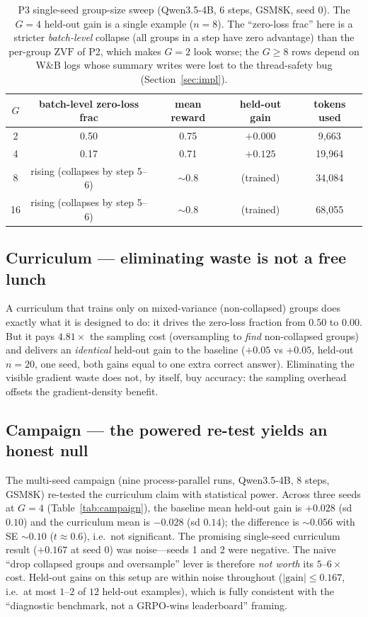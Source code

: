\documentclass[12pt,a4paper]{report}
\newcommand{\zvf}{\mathrm{ZVF}}
\begin{document}
\begin{table}[t]
\centering
\small
\begin{tabular}{@{}ccccc@{}}
\toprule
$G$ & batch-level zero-loss frac & mean reward & held-out gain & tokens used \\
\midrule
2  & 0.50 & 0.75 & $+0.000$ & 9{,}663 \\
4  & 0.17 & 0.71 & $+0.125$ & 19{,}964 \\
8  & rising (collapses by step 5--6) & ${\sim}0.8$ & (trained) & 34{,}084 \\
16 & rising (collapses by step 5--6) & ${\sim}0.8$ & (trained) & 68{,}055 \\
\bottomrule
\end{tabular}
\caption{P3 single-seed group-size sweep (Qwen3.5-4B, 6 steps, GSM8K, seed 0).
The $G{=}4$ held-out gain is a single example ($n=8$). The ``zero-loss frac''
here is a stricter \emph{batch-level} collapse (all groups in a step have zero
advantage) than the per-group $\zvf$ of P2, which makes $G{=}2$ look worse; the
$G\ge8$ rows depend on W\&B logs whose summary writes were lost to the
thread-safety bug (Section~\ref{sec:impl}).}
\label{tab:p3}
\end{table}

\subsection{Curriculum --- eliminating waste is not a free lunch}
A curriculum that trains only on mixed-variance (non-collapsed) groups does
exactly what it is designed to do: it drives the zero-loss fraction from $0.50$
to $0.00$. But it pays $4.81\times$ the sampling cost (oversampling to \emph{find}
non-collapsed groups) and delivers an \emph{identical} held-out gain to the
baseline ($+0.05$ vs $+0.05$, held-out $n=20$, one seed, both gains equal to one
extra correct answer). Eliminating the visible gradient waste does not, by
itself, buy accuracy: the sampling overhead offsets the gradient-density benefit.

\subsection{Campaign --- the powered re-test yields an honest null}

The multi-seed campaign (nine process-parallel runs, Qwen3.5-4B, 8 steps, GSM8K)
re-tested the curriculum claim with statistical power. Across three seeds at
$G{=}4$ (Table~\ref{tab:campaign}), the baseline mean held-out gain is
$+0.028$ (sd $0.10$) and the curriculum mean is $-0.028$ (sd $0.14$); the
difference is ${\sim}0.056$ with SE ${\sim}0.10$ ($t\approx0.6$), i.e.\ not
significant. The promising single-seed curriculum result ($+0.167$ at seed 0) was
noise---seeds 1 and 2 were negative. The naive ``drop collapsed groups and
oversample'' lever is therefore \emph{not worth} its $5$--$6\times$ cost. Held-out
gains on this setup are within noise throughout ($|\text{gain}|\le0.167$, i.e.\ at
most $1$--$2$ of $12$ held-out examples), which is fully consistent with the
``diagnostic benchmark, not a GRPO-wins leaderboard'' framing.
\end{document}
